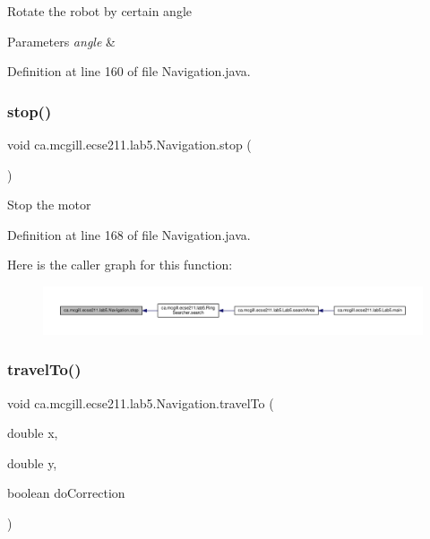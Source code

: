 Rotate the robot by certain angle


\begin{DoxyParams}{Parameters}
{\em angle} & \\
\hline
\end{DoxyParams}


Definition at line 160 of file Navigation.\+java.

\mbox{\label{classca_1_1mcgill_1_1ecse211_1_1lab5_1_1_navigation_afe038af6692e7ad28c3587cd979d7223}} 
\subsubsection{\texorpdfstring{stop()}{stop()}}
{\footnotesize\ttfamily void ca.\+mcgill.\+ecse211.\+lab5.\+Navigation.\+stop (\begin{DoxyParamCaption}{ }\end{DoxyParamCaption})}

Stop the motor 

Definition at line 168 of file Navigation.\+java.

Here is the caller graph for this function\+:
\nopagebreak
\begin{figure}[H]
\begin{center}
\leavevmode
\includegraphics[width=350pt]{classca_1_1mcgill_1_1ecse211_1_1lab5_1_1_navigation_afe038af6692e7ad28c3587cd979d7223_icgraph}
\end{center}
\end{figure}
\mbox{\label{classca_1_1mcgill_1_1ecse211_1_1lab5_1_1_navigation_a318969f4776d0bf4a8721be3d2444a5c}} 
\subsubsection{\texorpdfstring{travel\+To()}{travelTo()}}
{\footnotesize\ttfamily void ca.\+mcgill.\+ecse211.\+lab5.\+Navigation.\+travel\+To (\begin{DoxyParamCaption}\item[{double}]{x,  }\item[{double}]{y,  }\item[{boolean}]{do\+Correction }\end{DoxyParamCaption})}

